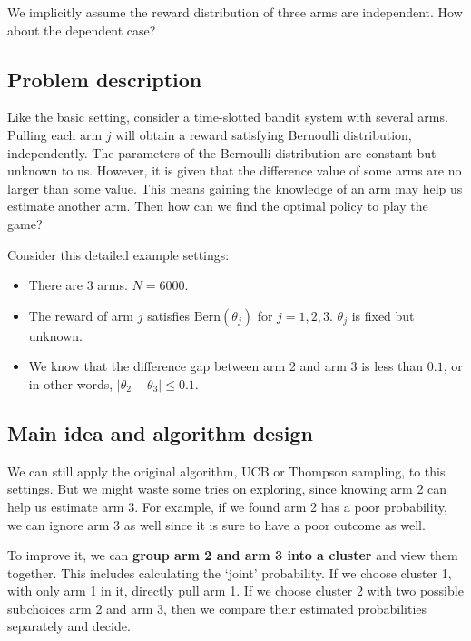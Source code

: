\documentclass[11pt]{article}
\begin{document}
We implicitly assume the reward distribution of three arms are
independent. How about the dependent case? 

\hypertarget{problem-description}{%
\subsection{Problem description}\label{problem-description}}

Like the basic setting, consider a time-slotted bandit system with
several arms. Pulling each arm \(j\) will obtain a reward satisfying
Bernoulli distribution, independently. The parameters of the Bernoulli
distribution are constant but unknown to us. However, it is given that
the difference value of some arms are no larger than some value. This
means gaining the knowledge of an arm may help us estimate another arm.
Then how can we find the optimal policy to play the game?

Consider this detailed example settings:

\begin{itemize}
\item
  There are 3 arms. \(N = 6000\).
\item
  The reward of arm \(j\) satisfies \(\mathrm{Bern}(\theta_j)\) for
  \(j = 1,2,3\). \(\theta_j\) is fixed but unknown.
\item
  We know that the difference gap between arm 2 and arm 3 is less than
  \(0.1\), or in other words,
  \(\lvert \theta_2 - \theta_3 \rvert \leq 0.1\).
\end{itemize}

\hypertarget{main-idea-and-algorithm-design}{%
\subsection{Main idea and algorithm
design}\label{main-idea-and-algorithm-design}}

We can still apply the original algorithm, UCB or Thompson sampling, to
this settings. But we might waste some tries on exploring, since knowing
arm 2 can help us estimate arm 3. For example, if we found arm 2 has a
poor probability, we can ignore arm 3 as well since it is sure to have a
poor outcome as well.

To improve it, we can \textbf{group arm 2 and arm 3 into a cluster} and
view them together. This includes calculating the `joint' probability.
If we choose cluster 1, with only arm 1 in it, directly pull arm 1. If
we choose cluster 2 with two possible subchoices arm 2 and arm 3, then
we compare their estimated probabilities separately and decide.
\end{document}
